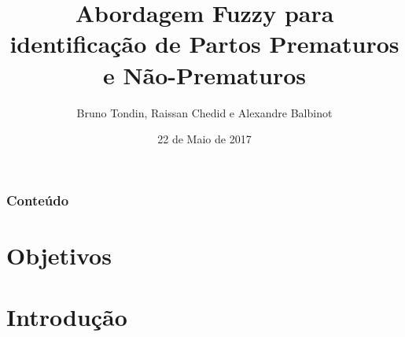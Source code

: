 \documentclass{beamer}
\title[DELET-UFRGS]{Abordagem Fuzzy para identifica\c{c}\~ao de Partos Prematuros e N\~ao-Prematuros} %
\author{Bruno Tondin, Raissan Chedid e Alexandre Balbinot} %
\institute[UFRGS] %
{
Universidade Federal do Rio Grande do Sul \\ %
\medskip
\textit{btondin@hcpa.edu.br, raissan@gmail.com} %
}
\date{ 22 de Maio de 2017} %
\begin{document}
\begin{frame}
\titlepage %
\end{frame}

\begin{frame}
\frametitle{Conte\'udo} %
\tableofcontents %
\end{frame}


\section{Objetivos} %

\section{Introdu\c{c}\~ao} 



\end{document}
